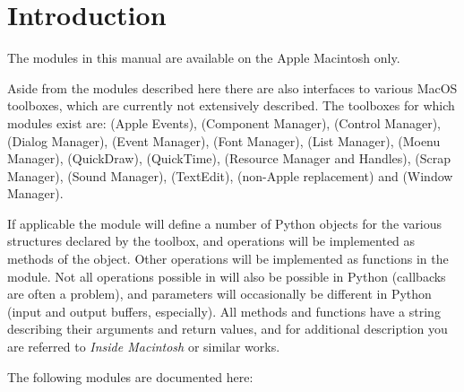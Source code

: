 \section{Introduction}
\label{intro}

The modules in this manual are available on the Apple Macintosh only.

Aside from the modules described here there are also interfaces to
various MacOS toolboxes, which are currently not extensively
described. The toolboxes for which modules exist are:
 (Apple Events),
 (Component Manager),
 (Control Manager),
 (Dialog Manager),
 (Event Manager),
 (Font Manager),
 (List Manager),
 (Moenu Manager),
 (QuickDraw),
 (QuickTime),
 (Resource Manager and Handles),
 (Scrap Manager),
 (Sound Manager),
 (TextEdit),
 (non-Apple  replacement) and
 (Window Manager).

If applicable the module will define a number of Python objects for
the various structures declared by the toolbox, and operations will be
implemented as methods of the object. Other operations will be
implemented as functions in the module. Not all operations possible in
\C{} will also be possible in Python (callbacks are often a problem), and
parameters will occasionally be different in Python (input and output
buffers, especially). All methods and functions have a 
string describing their arguments and return values, and for
additional description you are referred to \emph{Inside Macintosh} or
similar works.

The following modules are documented here:

